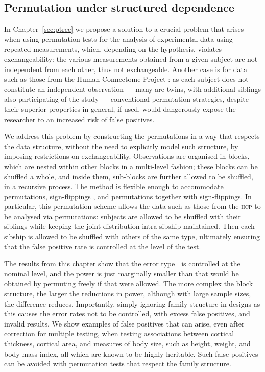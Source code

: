 \subsection{Permutation under structured dependence}

In Chapter~\ref{sec:ptree} we propose a solution to a crucial problem that arises when using permutation tests for the analysis of experimental data using repeated measurements, which, depending on the hypothesis, violates exchangeability: the various measurements obtained from a given subject are not independent from each other, thus not exchangeable. Another case is for data such as those from the Human Connectome Project \citep[\textsc{hcp};][]{VanEssen2012,VanEssen2013}: as each subject does not constitute an independent observation --- many are twins, with additional siblings also participating of the study --- conventional permutation strategies, despite their superior properties in general, if used, would dangerously expose the researcher to an increased risk of false positives.

We address this problem by constructing the permutations in a way that respects the data structure, without the need to explicitly model such structure, by imposing restrictions on exchangeability. Observations are organised in blocks, which are nested within other blocks in a multi-level fashion; these blocks can be shuffled a whole, and inside them, sub-blocks are further allowed to be shuffled, in a recursive process. The method is flexible enough to accommodate permutations, sign-flippings \citep[sometimes also called \emph{wild bootstrap};][]{Guillaume2014}, and permutations together with sign-flippings. In particular, this permutation scheme allows the data such as those from the \textsc{hcp} to be analysed via permutations: subjects are allowed to be shuffled with their siblings while keeping the joint distribution intra-sibship maintained. Then each sibship is allowed to be shuffled with others of the same type, ultimately ensuring that the false positive rate is controlled at the level of the test.

The results from this chapter show that the error type \textsc{i} is controlled at the nominal level, and the power is just marginally smaller than that would be obtained by permuting freely if that were allowed. The more complex the block structure, the larger the reductions in power, although with large sample sizes, the difference reduces. Importantly, simply ignoring family structure in designs as this causes the error rates not to be controlled, with excess false positives, and invalid results. We show examples of false positives that can arise, even after correction for multiple testing, when testing associations between cortical thickness, cortical area, and measures of body size, such as height, weight, and body-mass index, all which are known to be highly heritable. Such false positives can be avoided with permutation tests that respect the family structure.

